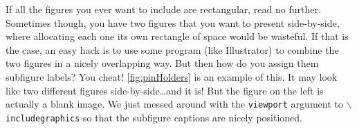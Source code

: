 If all the figures you ever want to include are rectangular, read no further.
Sometimes though, you have two figures that you want to present side-by-side, where allocating each one its own rectangle of space would be wasteful.
If that is the case, an easy hack is to use some program (like Illustrator) to combine the two figures in a nicely overlapping way.
But then how do you assign them subfigure labels?
You cheat!
\autoref{fig:pinHolders} is an example of this.
It may look like two different figures side-by-side\dots and it is!
But the figure on the left is actually a blank image.
We just messed around with the \texttt{viewport} argument to $\backslash$\texttt{includegraphics} so that the subfigure captions are nicely positioned. 